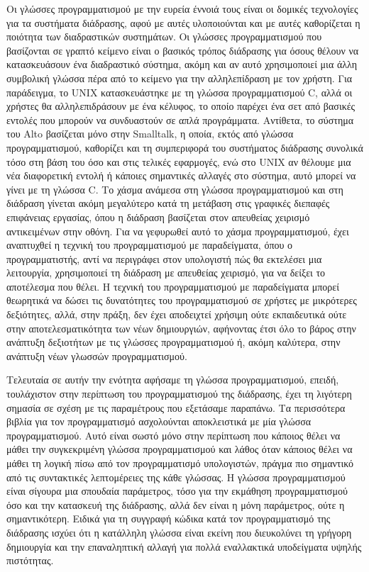 \documentclass[
]{article}
\begin{document}
Οι γλώσσες προγραμματισμού με την ευρεία έννοιά τους είναι οι δομικές
τεχνολογίες για τα συστήματα διάδρασης, αφού με αυτές υλοποιούνται και
με αυτές καθορίζεται η ποιότητα των διαδραστικών συστημάτων. Οι γλώσσες
προγραμματισμού που βασίζονται σε γραπτό κείμενο είναι ο βασικός τρόπος
διάδρασης για όσους θέλουν να κατασκευάσουν ένα διαδραστικό σύστημα,
ακόμη και αν αυτό χρησιμοποιεί μια άλλη συμβολική γλώσσα πέρα από το
κείμενο για την αλληλεπίδραση με τον χρήστη. Για παράδειγμα, το UNIX
κατασκευάστηκε με τη γλώσσα προγραμματισμού C, αλλά οι χρήστες θα
αλληλεπιδράσουν με ένα κέλυφος, το οποίο παρέχει ένα σετ από βασικές
εντολές που μπορούν να συνδυαστούν σε απλά προγράμματα. Αντίθετα, το
σύστημα του Alto βασίζεται μόνο στην Smalltalk, η οποία, εκτός από
γλώσσα προγραμματισμού, καθορίζει και τη συμπεριφορά του συστήματος
διάδρασης συνολικά τόσο στη βάση του όσο και στις τελικές εφαρμογές, ενώ
στο UNIX αν θέλουμε μια νέα διαφορετική εντολή ή κάποιες σημαντικές
αλλαγές στο σύστημα, αυτό μπορεί να γίνει με τη γλώσσα C. Το χάσμα
ανάμεσα στη γλώσσα προγραμματισμού και στη διάδραση γίνεται ακόμη
μεγαλύτερο κατά τη μετάβαση στις γραφικές διεπαφές επιφάνειας εργασίας,
όπου η διάδραση βασίζεται στον απευθείας χειρισμό αντικειμένων στην
οθόνη. Για να γεφυρωθεί αυτό το χάσμα προγραμματισμού, έχει αναπτυχθεί η
τεχνική του προγραμματισμού με παραδείγματα, όπου ο προγραμματιστής,
αντί να περιγράφει στον υπολογιστή πώς θα εκτελέσει μια λειτουργία,
χρησιμοποιεί τη διάδραση με απευθείας χειρισμό, για να δείξει το
αποτέλεσμα που θέλει. Η τεχνική του προγραμματισμού με παραδείγματα
μπορεί θεωρητικά να δώσει τις δυνατότητες του προγραμματισμού σε χρήστες
με μικρότερες δεξιότητες, αλλά, στην πράξη, δεν έχει αποδειχτεί χρήσιμη
ούτε εκπαιδευτικά ούτε στην αποτελεσματικότητα των νέων δημιουργιών,
αφήνοντας έτσι όλο το βάρος στην ανάπτυξη δεξιοτήτων με τις γλώσσες
προγραμματισμού ή, ακόμη καλύτερα, στην ανάπτυξη νέων γλωσσών
προγραμματισμού.

Τελευταία σε αυτήν την ενότητα αφήσαμε τη γλώσσα προγραμματισμού,
επειδή, τουλάχιστον στην περίπτωση του προγραμματισμού της διάδρασης,
έχει τη λιγότερη σημασία σε σχέση με τις παραμέτρους που εξετάσαμε
παραπάνω. Τα περισσότερα βιβλία για τον προγραμματισμό ασχολούνται
αποκλειστικά με μία γλώσσα προγραμματισμού. Αυτό είναι σωστό μόνο στην
περίπτωση που κάποιος θέλει να μάθει την συγκεκριμένη γλώσσα
προγραμματισμού και λάθος όταν κάποιος θέλει να μάθει τη λογική πίσω από
τον προγραμματισμό υπολογιστών, πράγμα πιο σημαντικό από τις συντακτικές
λεπτομέρειες της κάθε γλώσσας. Η γλώσσα προγραμματισμού είναι σίγουρα
μια σπουδαία παράμετρος, τόσο για την εκμάθηση προγραμματισμού όσο και
την κατασκευή της διάδρασης, αλλά δεν είναι η μόνη παράμετρος, ούτε η
σημαντικότερη. Ειδικά για τη συγγραφή κώδικα κατά τον προγραμματισμό της
διάδρασης ισχύει ότι η κατάλληλη γλώσσα είναι εκείνη που διευκολύνει τη
γρήγορη δημιουργία και την επαναληπτική αλλαγή για πολλά εναλλακτικά
υποδείγματα υψηλής πιστότητας.
\end{document}
